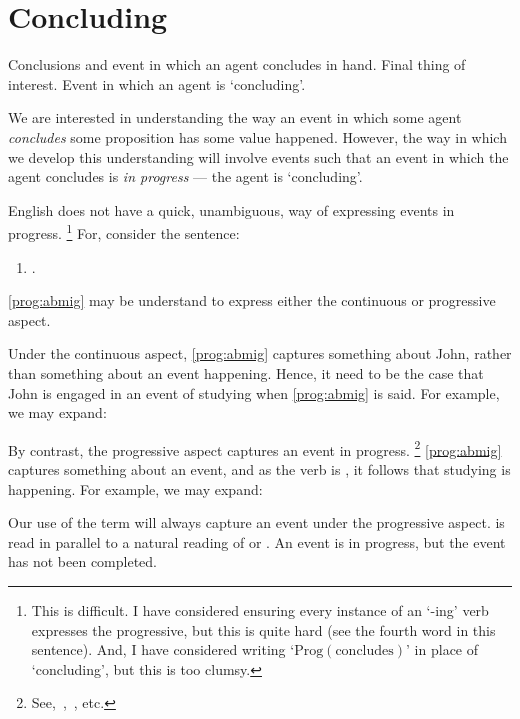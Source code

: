 \section{Concluding}
\label{cha:clar:sec:Cing}

\begin{note}
  Conclusions and event in which an agent concludes in hand.
  Final thing of interest.
  Event in which an agent is `concluding'.

  We are interested in understanding the way an event in which some agent \emph{concludes} some proposition has some value happened.
  However, the way in which we develop this understanding will involve events such that an event in which the agent concludes is \emph{in progress} --- the agent is `concluding'.

  English does not have a quick, unambiguous, way of expressing events in progress.%
  \footnote{
    This is difficult.
    I have considered ensuring every instance of an `-ing' verb expresses the progressive, but this is quite hard (see the fourth word in this sentence).
    And, I have considered writing `\(\text{Prog}(\text{concludes})\)' in place of `concluding', but this is too clumsy.
  }
  For, consider the sentence:
  \begin{enumerate}[label=\arabic*., ref=(\arabic*)]
  \item
    \label{prog:abmig}
    .
  \end{enumerate}
  \ref{prog:abmig} may be understand to express either the continuous or progressive aspect.

  Under the continuous aspect, \ref{prog:abmig} captures something about John, rather than something about an event happening.
  Hence, it need to be the case that John is engaged in an event of studying when \ref{prog:abmig} is said.
  For example, we may expand:

  By contrast, the progressive aspect captures an event in progress.%
  \footnote{
    See,~\textcite{Richards:1981wo},~\textcite{Portner:2011vi}, etc.
  }
  \ref{prog:abmig} captures something about an event, and as the verb is , it follows that studying is happening.
  For example, we may expand:
\end{note}

\begin{note}
  Our use of the term  will always capture an event under the progressive aspect.
   is read in parallel to a natural reading of   or .
  An event is in progress, but the event has not been completed.
\end{note}

